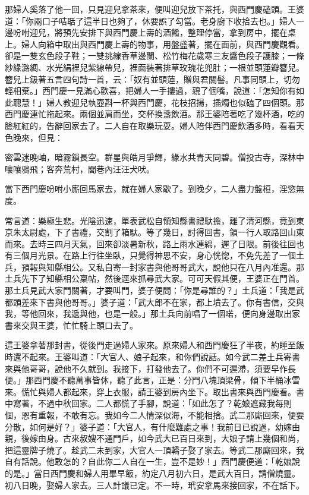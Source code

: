 那婦人奚落了他一回，只見迎兒拿茶來，便叫迎兒放下茶托，與西門慶磕頭。王婆道：「你兩口子咭聒了這半日也夠了，休要誤了勾當。老身廚下收拾去也。」婦人一邊吩咐迎兒，將預先安排下與西門慶上壽的酒餚，整理停當，拿到房中，擺在桌上。婦人向箱中取出與西門慶上壽的物事，用盤盛著，擺在面前，與西門慶觀看。卻是一雙玄色段子鞋；一雙挑線香草邊闌、松竹梅花歲寒三友醬色段子護膝；一條紗綠潞綢、水光絹裡兒紫線帶兒，裡面裝著排草玫瑰花兜肚；一根並頭蓮瓣簪兒。簪兒上鈒著五言四句詩一首，云：「奴有並頭蓮，贈與君關髻。凡事同頭上，切勿輕相棄。」西門慶一見滿心歡喜，把婦人一手摟過，親了個嘴，說道：「怎知你有如此聰慧！」婦人教迎兒執壺斟一杯與西門慶，花枝招揚，插燭也似磕了四個頭。那西門慶連忙拖起來。兩個並肩而坐，交杯換盞飲酒。那王婆陪著吃了幾杯酒，吃的臉紅紅的，告辭回家去了。二人自在取樂玩耍。婦人陪伴西門慶飲酒多時，看看天色晚來，但見：

密雲迷晚岫，暗霧鎖長空。群星與皓月爭輝，綠水共青天同碧。僧投古寺，深林中嚷嚷鴉飛；客奔荒村，閭巷內汪汪犬吠。

當下西門慶吩咐小廝回馬家去，就在婦人家歇了。到晚夕，二人盡力盤桓，淫慾無度。

常言道：樂極生悲。光陰迅速，單表武松自領知縣書禮馱擔，離了清河縣，竟到東京朱太尉處，下了書禮，交割了箱馱。等了幾日，討得回書，領一行人取路回山東而來。去時三四月天氣，回來卻淡暑新秋，路上雨水連綿，遲了日限。前後往回也有三個月光景。在路上行往坐臥，只覺得神思不安，身心恍惚，不免先差了一個土兵，預報與知縣相公。又私自寄一封家書與他哥哥武大，說他只在八月內准還。那土兵先下了知縣相公稟帖，然後逕來抓尋武大家。可可天假其便，王婆正在門首。那土兵見武大家門關著，才要叫門，婆子便問：「你是尋誰的？」土兵道：「我是武都頭差來下書與他哥哥。」婆子道：「武大郎不在家，都上墳去了。你有書信，交與我，等他回來，我遞與他，也是一般。」那土兵向前唱了一個喏，便向身邊取出家書來交與王婆，忙忙騎上頭口去了。

這王婆拿著那封書，從後門走過婦人家來。原來婦人和西門慶狂了半夜，約睡至飯時還不起來。王婆叫道：「大官人、娘子起來，和你們說話。如今武二差土兵寄書來與他哥哥，說他不久就到。我接下，打發他去了。你們不可遲滯，須要早作長便。」那西門慶不聽萬事皆休，聽了此言，正是：分門八塊頂梁骨，傾下半桶冰雪來。慌忙與婦人都起來，穿上衣服，請王婆到房內坐下。取出書來與西門慶看。書中寫著，不過中秋回家。二人都慌了手腳，說道：「如此怎了？乾娘遮藏我每則個，恩有重報，不敢有忘。我如今二人情深似海，不能相捨。武二那廝回來，便要分散，如何是好？」婆子道：「大官人，有什麼難處之事！我前日已說過，幼嫁由親，後嫁由身。古來叔嫂不通門戶，如今武大已百日來到，大娘子請上幾個和尚，把這靈牌子燒了。趁武二未到家，大官人一頂轎子娶了家去。等武二那廝回來，我自有話說。他敢怎的？自此你二人自在一生，豈不是妙！」西門慶便道：「乾娘說的是。」當日西門慶和婦人用畢早飯，約定八月初六日，是武大百日，請僧燒靈。初八日晚，娶婦人家去。三人計議已定。不一時，玳安拿馬來接回家，不在話下。

